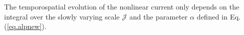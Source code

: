 %
%
The temporospatial evolution of the nonlinear current only depends on the integral over the slowly varying scale $\mathcal{J}$ and the parameter $\alpha$ defined in Eq. (\ref{eq.alpnew}). 
